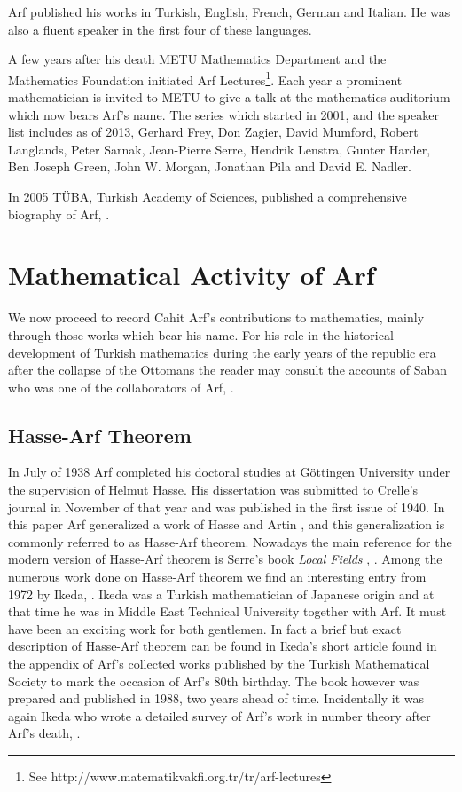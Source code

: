 \documentclass[12pt]{amsart}
\begin{document}
Arf published his works in Turkish, English, French,  German and Italian. He was  also a fluent speaker in the first four of these languages.

A few years after his death METU Mathematics Department and the Mathematics Foundation initiated Arf Lectures\footnote{See http://www.matematikvakfi.org.tr/tr/arf-lectures}. Each year a prominent mathematician is invited to METU to give a talk at the mathematics auditorium which now bears Arf's name. The  series which started in 2001, and the speaker list includes as of 2013,  Gerhard Frey, Don Zagier, David Mumford, Robert Langlands, Peter Sarnak,
Jean-Pierre Serre, Hendrik Lenstra, Gunter Harder, Ben Joseph Green, John W. Morgan, Jonathan Pila and David E. Nadler.

In 2005 T\"{U}BA, Turkish Academy of Sciences, published a comprehensive biography of Arf, \cite{tosun}.

\section{Mathematical Activity of Arf}
We now proceed to record Cahit Arf's contributions to mathematics, mainly through those works which bear his name. For his role in the historical development of Turkish mathematics during the early years of the republic era after the collapse of the Ottomans  the reader may consult the accounts of Saban who was one of the collaborators of Arf, \cite{saban1,saban2}.
\subsection{Hasse-Arf Theorem}
In July of 1938 Arf completed his doctoral studies at G\"{o}ttingen University under the supervision of Helmut Hasse. His dissertation was submitted to Crelle's journal in November of that year and was published in the first issue of 1940. In this paper \cite{carf1} Arf generalized a work of Hasse \cite{hasse1,hasse2} and Artin \cite{artin}, and this generalization is commonly referred to as Hasse-Arf theorem. Nowadays the main reference for the modern version of Hasse-Arf theorem is  Serre's book {\it Local Fields}  , \cite[pages 76 and 93]{serre-local}. Among the numerous work done on Hasse-Arf theorem we find an interesting entry from 1972 by Ikeda, \cite{ikeda1}. Ikeda was a Turkish mathematician of Japanese origin and at that time he was in Middle East Technical University together with Arf. It must have been an exciting work for both gentlemen. In fact a brief but exact description of Hasse-Arf theorem  can be found in Ikeda's short article \cite{ikeda2} found in the appendix of Arf's collected works \cite{CW} published by the Turkish Mathematical Society to mark the occasion of Arf's 80th birthday.  The book however was prepared and published in 1988, two years ahead of time. Incidentally it was again Ikeda who wrote a detailed survey of Arf's work in number theory after Arf's death, \cite{ikeda3}.
\end{document}

